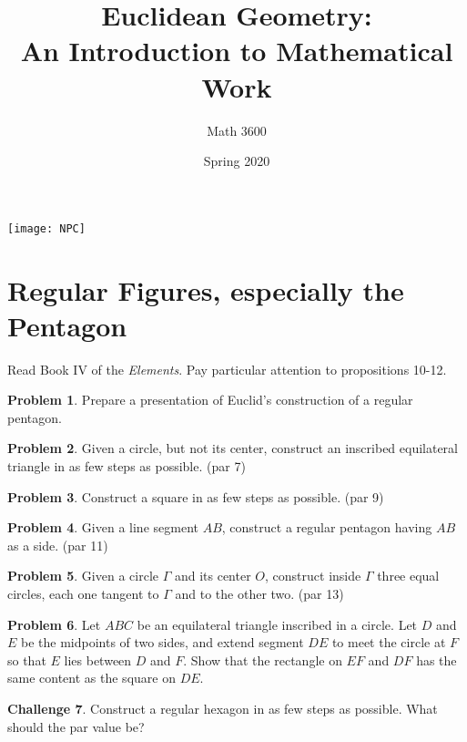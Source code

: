 \documentclass{tufte-handout}
\title{Euclidean Geometry:\\An Introduction to Mathematical Work}
\author[]{Math 3600}
\date{Spring 2020}
\theoremstyle{definition}
\newtheorem{problem}{Problem}[section]
\newtheorem{challenge}[problem]{Challenge}
\begin{document}
\maketitle

\begin{marginfigure}
    \texttt{[image: NPC]}
\end{marginfigure}

\setcounter{section}{15}
\section{Regular Figures, especially the Pentagon}

Read Book IV of the \emph{Elements}. Pay particular attention to propositions 10-12.

\begin{problem}\label{prob:GSP-reg-pentagon}
Prepare a presentation of Euclid's construction of a regular pentagon.
\end{problem}

\begin{problem}\label{prob:circle-inscribe-triangle} Given a circle, but not its center, construct an inscribed equilateral triangle in as few steps as possible. (par 7)
\end{problem}

\begin{problem}\label{prob:square}
Construct a square in as few steps as possible. (par 9)
\end{problem}

\begin{problem}\label{prob:side-reg-pent}
Given a line segment $AB$, construct a regular pentagon having $AB$ as a side. (par 11)
\end{problem}

\begin{problem}\label{prob:circle-three-tangent-circles}
Given a circle $\Gamma$ and its center $O$, construct inside $\Gamma$ three equal circles, each one tangent to $\Gamma$ and to the other two. (par 13)
\end{problem}

\begin{problem}\label{prob:inscribed-circle-content}
Let $ABC$ be an equilateral triangle inscribed in a circle. Let $D$ and $E$ be the midpoints of two sides, and extend segment $DE$ to meet the circle at $F$ so that $E$ lies between $D$ and $F$. Show that the rectangle on $EF$ and $DF$ has the same content as the square on $DE$.
\end{problem}


\begin{challenge}\label{chal:hexagon}
Construct a regular hexagon in as few steps as possible. What should the par value be?
\end{challenge}

\vfill
\end{document}
